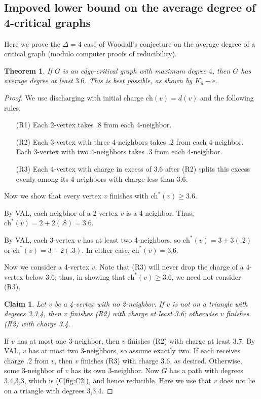 \documentclass[12pt]{article}
\theoremstyle{plain}
\newtheorem{thm}{Theorem}[section]
\newtheorem{clm}{Claim}
\theoremstyle{definition}
\theoremstyle{remark}
\def\ch{\textrm{ch}}
\begin{document}
\subsection{Impoved lower bound on the average degree of 4-critical graphs}
Here we prove the $\Delta=4$ case of Woodall's conjecture \cite{woodall2008average} on the average degree of a critical graph (modulo computer proofs of reducibility).

\begin{thm}
	If $G$ is an edge-critical graph with maximum degree $4$, then $G$ has average degree at least $3.6$.
	This is best possible, as shown by $K_5-e$.
\end{thm}
\begin{proof}
	We use discharging with initial charge $\ch(v)=d(v)$ and the following rules.
	\begin{enumerate}
		\item[(R1)] Each 2-vertex takes $.8$ from each 4-neighbor.
		\item[(R2)] Each 3-vertex with three 4-neighbors takes $.2$ from each 4-neighbor.
		Each 3-vertex with two 4-neighbors takes $.3$ from each 4-neighbor.
		\item[(R3)] Each 4-vertex with charge in excess of $3.6$ after (R2) splits this
		excess evenly among its 4-neighbors with charge less than $3.6$.
	\end{enumerate}
	
	Now we show that every vertex $v$ finishes with $\ch^*(v)\ge 3.6$.
	
	By VAL, each neigbhor of a 2-vertex $v$ is a 4-neighbor.  Thus,
	$\ch^*(v)=2+2(.8)=3.6$.
	
	By VAL, each 3-vertex $v$ has at least two 4-neighbors, so $\ch^*(v)=3+3(.2)$ or
	$\ch^*(v)=3+2(.3)$.  In either case, $\ch^*(v)=3.6$.
	
	Now we consider a 4-vertex $v$.  Note that (R3) will never drop the charge of a
	4-vertex below $3.6$; thus, in showing that $\ch^*(v)\ge 3.6$, we need not
	consider (R3).
	
	\begin{clm}
		Let $v$ be a 4-vertex with no 2-neighbor. 
		If $v$ is not on a triangle with degrees 3,3,4, then $v$ finishes (R2) with
		charge at least 3.6; otherwise $v$ finishes (R2) with charge 3.4.
		\label{clm1}
	\end{clm}
	If $v$ has at most one 3-neighbor, then $v$ finishes (R2) with charge at least 3.7.
	By VAL, $v$ has at most two 3-neighbors, so assume exactly two.  If each
	receives charge $.2$ from $v$, then $v$ finishes (R3) with charge 3.6, as
	desired.  Otherwise, some 3-neighbor of $v$ has its own 3-neighbor.  Now $G$ has
	a path with degrees 3,4,3,3, which is (C\ref{fig:C2}), and hence reducible.  
	Here we use that $v$ does not lie on a triangle with degrees 3,3,4.
	

\end{proof}
\end{document}
